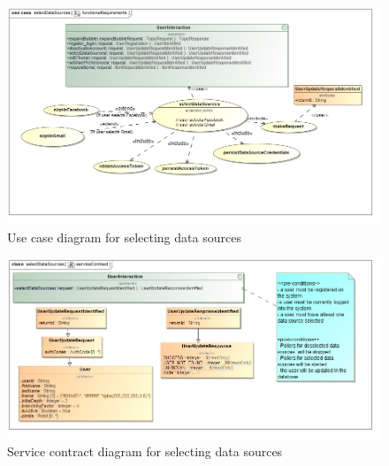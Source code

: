 \documentclass[hidelinks,english]{article}
\begin{document}
    			\begin{figure}[!h]
    			\includegraphics[width=\linewidth]{selectDataSourcesFunctionalRequirements.jpg}
    			\caption{Use case diagram for selecting data sources}
    			\label{UseCaseSelectDataSources}
    			\end{figure}
    			
    			\begin{figure}[!h]
    			\includegraphics[width=\linewidth]{selectDataSourcesServiceContract.jpg}
    			\caption{Service contract diagram for selecting data sources}
    			\label{ServiceContractSelectDataSources}
    			\end{figure}
    			
    			
    			
\end{document}
